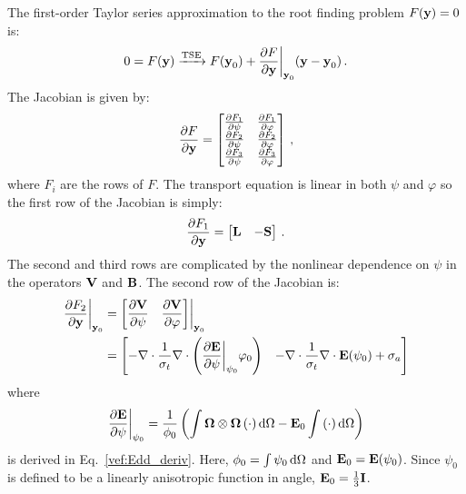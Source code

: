 \documentclass[../doc.tex]{subfiles}
\begin{document}
The first-order Taylor series approximation to the root finding problem $F(\boldsymbol{\mathrm{y}}) = 0$ is: 
	\begin{equation} \label{smm:smm_root}
		0 = F(\boldsymbol{\mathrm{y}}) \xrightarrow{\text{TSE}} F(\boldsymbol{\mathrm{y}}_0) + \frac{\partial F}{\partial \boldsymbol{\mathrm{y}}}\biggr\rvert_{\boldsymbol{\mathrm{y}}_0}(\boldsymbol{\mathrm{y}} - \boldsymbol{\mathrm{y}}_0) \,. 
	\end{equation}
The Jacobian is given by: 
	\begin{equation}
		\frac{\partial F}{\partial \boldsymbol{\mathrm{y}}} = \begin{bmatrix} 
			\frac{\partial F_1}{\partial \psi} & \frac{\partial F_1}{\partial \varphi} \\ 
			\frac{\partial F_2}{\partial \psi} & \frac{\partial F_2}{\partial \varphi} \\ 
			\frac{\partial F_3}{\partial \psi} & \frac{\partial F_3}{\partial \varphi} 
		\end{bmatrix} \,,
	\end{equation}
where $F_i$ are the rows of $F$. The transport equation is linear in both $\psi$ and $\varphi$ so the first row of the Jacobian is simply: 
	\begin{equation}
		\frac{\partial F_1}{\partial \boldsymbol{\mathrm{y}}} = \begin{bmatrix} 
			\boldsymbol{\mathrm{L}} & -\boldsymbol{\mathrm{S}} 
		\end{bmatrix} \,. 
	\end{equation}
The second and third rows are complicated by the nonlinear dependence on $\psi$ in the operators $\boldsymbol{\mathrm{V}}$ and $\boldsymbol{\mathrm{B}}$. The second row of the Jacobian is: 
	\begin{equation}
	\begin{aligned}
		\frac{\partial F_2}{\partial \boldsymbol{\mathrm{y}}}\biggr\rvert_{\boldsymbol{\mathrm{y}}_0} &= \begin{bmatrix} 
			\displaystyle\frac{\partial \boldsymbol{\mathrm{V}}}{\partial \psi} & \displaystyle\frac{\partial \boldsymbol{\mathrm{V}}}{\partial \varphi} 
		\end{bmatrix} \biggr\rvert_{\boldsymbol{\mathrm{y}}_0} \\
		&= \begin{bmatrix} 
			\displaystyle-\nabla\cdot\frac{1}{\sigma_t}\nabla\cdot\left( \frac{\partial \boldsymbol{\mathrm{E}}}{\partial \psi}\biggr\rvert_{\psi_0}\varphi_0 \right) & 
			\displaystyle-\nabla\cdot\frac{1}{\sigma_t}\nabla\cdot\boldsymbol{\mathrm{E}}(\psi_0) + \sigma_a 
		\end{bmatrix} 
	\end{aligned}
	\end{equation}
where 
	\begin{equation}
	 	\frac{\partial \boldsymbol{\mathrm{E}}}{\partial \psi}\biggr\rvert_{\psi_0} = \frac{1}{\phi_0}\left( \int \boldsymbol{\Omega}\otimes\boldsymbol{\Omega}\left( \cdot \right)\mathop{}\!\mathrm{d}\Omega - \boldsymbol{\mathrm{E}}_0\int \left( \cdot \right)\mathop{}\!\mathrm{d}\Omega \right)
	\end{equation} 
is derived in Eq.~\ref{vef:Edd_deriv}. Here, $\phi_0 = \int \psi_0 \mathop{}\!\mathrm{d} \Omega$ and $\boldsymbol{\mathrm{E}}_0 = \boldsymbol{\mathrm{E}}(\psi_0)$. Since $\psi_0$ is defined to be a linearly anisotropic function in angle, $\boldsymbol{\mathrm{E}}_0 = \frac{1}{3}\boldsymbol{\mathrm{I}}$. 
\end{document}

